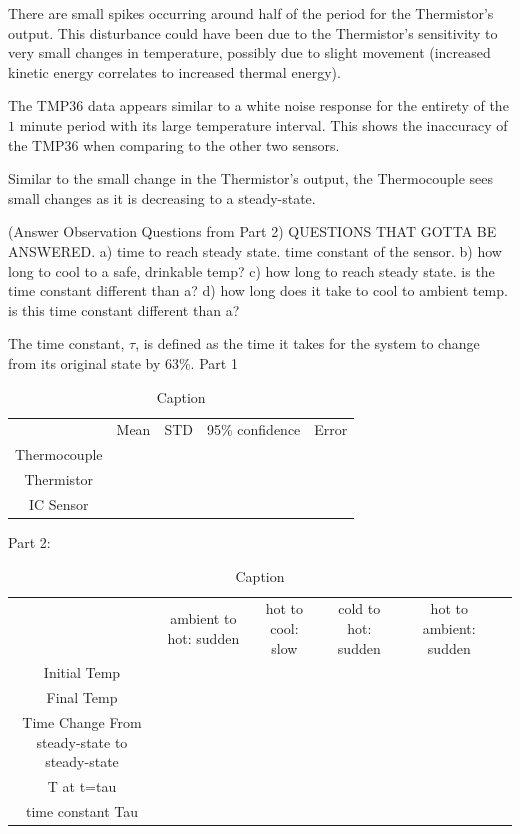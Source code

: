 \documentclass{article}
\begin{document}
    There are small spikes occurring around half of the period for the Thermistor's output. This disturbance could have been due to the Thermistor's sensitivity to very small changes in temperature, possibly due to slight movement (increased kinetic energy correlates to increased thermal energy).
    
    The TMP36 data appears similar to a white noise response for the entirety of the $1$ minute period with its large temperature interval. This shows the inaccuracy of the TMP36 when comparing to the other two sensors.
    
    Similar to the small change in the Thermistor's output, the Thermocouple sees small changes as it is decreasing to a steady-state. 

(Answer Observation Questions from Part 2)
QUESTIONS THAT GOTTA BE ANSWERED.
    a) time to reach steady state.  time constant of the sensor.  
    b) how long to cool to a safe, drinkable temp?
    c) how long to reach steady state.  is the time constant different than a?
    d) how long does it take to cool to ambient temp.  is this time constant different than a? 




The time constant, \(\tau\),  is defined as the time it takes for the system to change from its original state by 63\%.  %
Part 1 %
\begin{table}
    \centering
    \begin{tabular}{ccccc}
         &  Mean&  STD&  95\% confidence& Error\\
         Thermocouple&  &  &  & \\
         Thermistor&  &  &  & \\
         IC Sensor&  &  &  & \\
    \end{tabular}
    \caption{Caption}
    \label{tab:my_label}
\end{table}
    

Part 2: %

\begin{table}
    \centering
    \begin{tabular}{cccccc}
         &  ambient to hot: sudden&  hot to cool: slow&  cold to hot: sudden&  hot to ambient: sudden& \\
         Initial Temp&  &  &  &  & \\
         Final Temp&  &  &  &  & \\
         Time Change From steady-state to steady-state&  &  &  &  & \\
         T at t=tau&  &  &  &  & \\
         time constant Tau&  &  &  &  & \\
    \end{tabular}
    \caption{Caption}
    \label{tab:sudden_temp}
\end{table}
\end{document}
